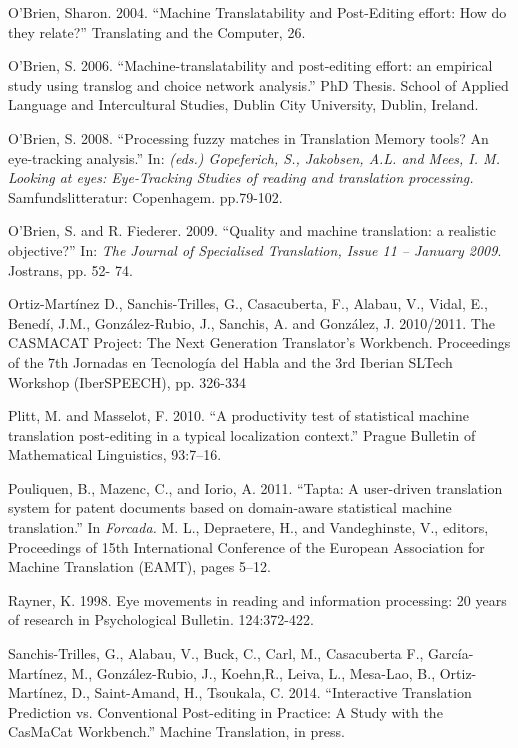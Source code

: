 \documentclass[output=paper]{langsci/langscibook}
\begin{document}
O’Brien, Sharon. 2004. “Machine Translatability and  Post-Editing effort: How do they relate?” Translating and the Computer, 26.



O'Brien, S. 2006. “Machine-translatability and post-editing effort: an empirical study using translog and choice network analysis.” PhD Thesis. School of Applied Language and\textit{ }Intercultural Studies, Dublin City University, Dublin, Ireland.



O’Brien, S. 2008. “Processing fuzzy matches in Translation Memory tools? An eye-tracking analysis.”  In: \textit{(eds.) Gopeferich, S., Jakobsen, A.L. and Mees, I. M. Looking at eyes: Eye-Tracking Studies of reading and translation processing.}  Samfundslitteratur: Copenhagem. pp.79-102.



O'Brien, S. and R. Fiederer. 2009. “Quality and machine translation: a realistic objective?” In: \textit{The Journal of Specialised Translation, Issue 11 – January 2009}. Jostrans, pp. 52- 74.



Ortiz-Martínez D., Sanchis-Trilles, G., Casacuberta, F., Alabau, V., Vidal, E., Benedí, J.M., González-Rubio, J., Sanchis, A. and González, J. 2010/2011. The CASMACAT Project: The Next Generation Translator’s Workbench. Proceedings of the 7th Jornadas en Tecnología del Habla and the 3rd Iberian SLTech Workshop (IberSPEECH), pp. 326-334



Plitt, M. and Masselot, F. 2010. “A productivity test of statistical machine translation post-editing in a typical localization context.” Prague Bulletin of Mathematical Linguistics, 93:7–16.



Pouliquen, B., Mazenc, C., and Iorio, A. 2011. “Tapta: A user-driven translation system for patent documents based on domain-aware statistical machine translation.” In \textit{Forcada. }M. L., Depraetere, H., and Vandeghinste, V., editors, Proceedings of 15th International Conference of the European Association for Machine Translation (EAMT), pages 5–12.



Rayner, K. 1998. Eye movements in reading and information processing: 20 years of research in Psychological Bulletin. 124:372-422.



Sanchis-Trilles, G., Alabau, V., Buck, C., Carl, M., Casacuberta F., García- Martínez, M., González-Rubio, J., Koehn,R., Leiva, L., Mesa-Lao, B., Ortiz-Martínez, D., Saint-Amand, H., Tsoukala, C. 2014. “Interactive Translation Prediction vs. Conventional Post-editing in Practice: A Study with the CasMaCat Workbench.” Machine Translation, in press.
\end{document}
